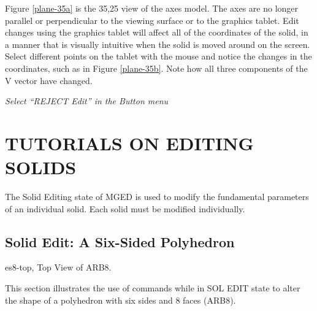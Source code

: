 
Figure \ref{plane-35a} is the 35,25 view of the axes model.
The axes are no longer
parallel or perpendicular to the viewing surface or to the graphics tablet.
Edit changes using the graphics tablet will affect all of the coordinates of
the solid, in a manner that is visually intuitive when the solid
is moved around on the screen.
Select different points on the tablet with the mouse and notice the
changes in the coordinates, such as in Figure \ref{plane-35b}.
Note how all three components of the V vector have changed.

{\em Select ``REJECT Edit'' in the Button menu}
\chapter{TUTORIALS ON EDITING SOLIDS}

The Solid Editing state of MGED is used to modify the fundamental
parameters of an individual solid.
Each solid must be modified individually.

\section{Solid Edit: A Six-Sided Polyhedron}
\mfig es8-top, Top View of ARB8.

This section illustrates the use of commands while in
SOL EDIT state to alter the
shape of a polyhedron with six sides and 8 faces (ARB8).


